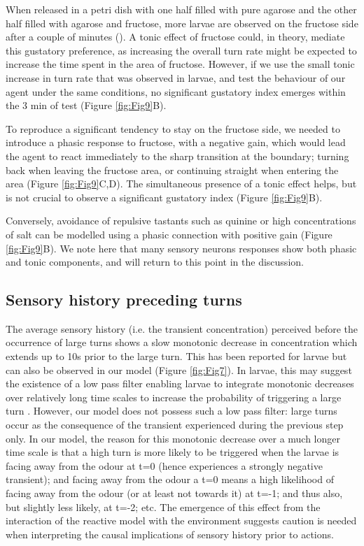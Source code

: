 \documentclass[10pt,a4paper]{article}
\begin{document}
When released in a petri dish with one half filled with pure agarose and the other half filled with agarose and fructose, more larvae are observed on the fructose side after a couple of minutes (\citep{schleyer2011behavior}). A tonic effect of fructose could, in theory, mediate this gustatory preference, as increasing the overall turn rate might be expected to increase the time spent in the area of fructose. However, if we use the small tonic increase in turn rate that was observed in larvae, and test the behaviour of our agent under the same conditions, no significant gustatory index emerges within the 3 min of test (Figure \ref{fig:Fig9}B).

 To reproduce a significant tendency to stay on the fructose side, we needed to introduce a phasic response to fructose, with a negative gain, which would lead the agent to react immediately to the sharp transition at the boundary; turning back when leaving the fructose area, or continuing straight when entering the area (Figure \ref{fig:Fig9}C,D). The simultaneous presence of a tonic effect helps, but is not crucial to observe a significant gustatory index (Figure \ref{fig:Fig9}B).

  Conversely, avoidance of repulsive tastants such as quinine or high concentrations of salt \citep{schleyer2011behavior} can be modelled using a phasic connection with positive gain (Figure \ref{fig:Fig9}B). We note here that many sensory neurons responses show both phasic and tonic components, and will return to this point in the discussion.

\subsection{Sensory history preceding turns}
The average sensory history (i.e. the transient concentration) perceived before the occurrence of large turns shows a slow monotonic decrease in concentration which extends up to 10s prior to the large turn. This has been reported for larvae  \citep{gomez2011active} but can also be observed in our model (Figure \ref{fig:Fig7}). In larvae, this may suggest the existence of a low pass filter enabling larvae to integrate monotonic decreases over relatively long time scales to increase the probability of triggering a large turn \citep{gomez2011active,davies2015model}. However, our model does not possess such a low pass filter: large turns occur as the consequence of the transient experienced during the previous step only. In our model, the reason for this monotonic decrease over a much longer time scale is that a high turn is more likely to be triggered when the larvae is facing away from the odour at t=0 (hence experiences a strongly negative transient); and facing away from the odour a t=0 means a high likelihood of facing away from the odour (or at least not towards it) at t=-1; and thus also, but slightly less likely, at t=-2; etc. The emergence of this effect from the interaction of the reactive model with the environment suggests caution is needed when interpreting the causal implications of sensory history prior to actions.
\end{document}
